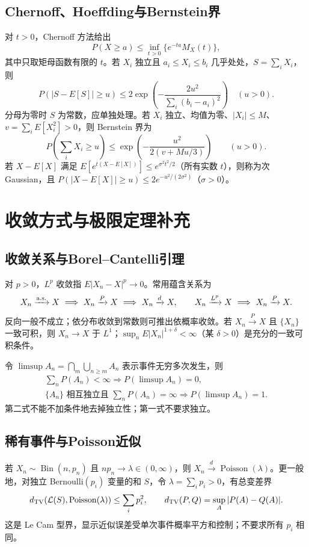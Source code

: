 \documentclass[../main.tex]{subfiles}
\begin{document}
\subsection{Chernoff、Hoeffding与Bernstein界}
对 $t>0$，Chernoff 方法给出
\[
P(X\ge a)\le\inf_{t>0}\{e^{-ta}M_X(t)\},
\]
其中只取矩母函数有限的 $t$。若 $X_i$ 独立且 $a_i\le X_i\le b_i$ 几乎处处，$S=\sum_iX_i$，则
\[
P(|S-E[S]|\ge u)\le2\exp\!\left(-\frac{2u^2}{\sum_i(b_i-a_i)^2}\right)\quad(u>0).
\]
分母为零时 $S$ 为常数，应单独处理。若 $X_i$ 独立、均值为零、$|X_i|\le M$、$v=\sum_iE[X_i^2]>0$，则 Bernstein 界为
\[
P\!\left(\sum_iX_i\ge u\right)\le
\exp\!\left(-\frac{u^2}{2(v+Mu/3)}\right)\qquad(u>0).
\]
若 $X-E[X]$ 满足 $E[e^{t(X-E[X])}]\le e^{\sigma^2t^2/2}$（所有实数 $t$），则称为次 Gaussian，且 $P(|X-E[X]|\ge u)\le2e^{-u^2/(2\sigma^2)}$（$\sigma>0$）。

\section{收敛方式与极限定理补充}
\subsection{收敛关系与Borel--Cantelli引理}
对 $p>0$，$L^p$ 收敛指 $E|X_n-X|^p\to0$。常用蕴含关系为
\[
X_n\xrightarrow{\rm a.s.}X\ \Longrightarrow\ X_n\xrightarrow P X\ \Longrightarrow\ X_n\xrightarrow d X,
\qquad X_n\xrightarrow{L^p}X\ \Longrightarrow\ X_n\xrightarrow P X.
\]
反向一般不成立；依分布收敛到常数则可推出依概率收敛。若 $X_n\xrightarrow P X$ 且 $\{X_n\}$ 一致可积，则 $X_n\to X$ 于 $L^1$；$\sup_nE|X_n|^{1+\delta}<\infty$（某 $\delta>0$）是充分的一致可积条件。

令 $\limsup A_n=\bigcap_m\bigcup_{n\ge m}A_n$ 表示事件无穷多次发生，则
\begin{gather*}
\sum_nP(A_n)<\infty\Longrightarrow P(\limsup A_n)=0,\\
\{A_n\}\text{ 相互独立且 }\sum_nP(A_n)=\infty
\Longrightarrow P(\limsup A_n)=1.
\end{gather*}
第二式不能不加条件地去掉独立性；第一式不要求独立。

\subsection{稀有事件与Poisson近似}
若 $X_n\sim\operatorname{Bin}(n,p_n)$ 且 $np_n\to\lambda\in(0,\infty)$，则 $X_n\xrightarrow d\operatorname{Poisson}(\lambda)$。更一般地，对独立 Bernoulli$(p_i)$ 变量的和 $S$，令 $\lambda=\sum_i p_i>0$，有总变差界
\[
d_{\rm TV}(\mathcal L(S),\operatorname{Poisson}(\lambda))\le\sum_i p_i^2,
\qquad d_{\rm TV}(P,Q)=\sup_A|P(A)-Q(A)|.
\]
这是 Le Cam 型界，显示近似误差受单次事件概率平方和控制；不要求所有 $p_i$ 相同。
\end{document}
